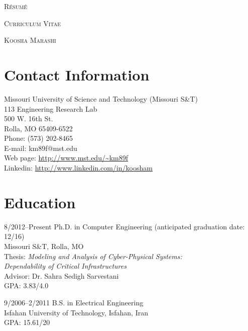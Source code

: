 \documentclass[10pt]{article}
\begin{document}
\thispagestyle{empty}

\begin{center}

\ifResume
    \huge{\textsc{R\'{e}sum\'{e}}}

\else
    \huge{\textsc{Curriculum Vitae}}
\fi

{\Large{\textsc{Koosha Marashi}}}

\end{center}

\section{Contact Information}

\begin{flushleft}

    Missouri University of Science and Technology (Missouri S\&T)\\
    113 Engineering Research Lab \\
    500 W. 16th St. \\
    Rolla, MO 65409-6522 \\
    Phone: (573) 202-8465 \\
    E-mail: km89f@mst.edu \\
    Web page: \url{http://www.mst.edu/\~km89f} \\
    Linkedin: \url{http://www.linkedin.com/in/koosham}

\end{flushleft}

\section{Education}

\begin{CV}

\item[8/2012--Present] Ph.D. in Computer Engineering (anticipated graduation date: 12/16)\\Missouri S\&T, Rolla, MO \\
    Thesis: \emph{Modeling and Analysis of Cyber-Physical Systems:\\Dependability of Critical Infrastructures} \\
    Advisor: Dr. Sahra Sedigh Sarvestani \\
    GPA: 3.83/4.0

\item[9/2006--2/2011] B.S. in Electrical Engineering \\ Isfahan University of Technology, Isfahan, Iran \\
    GPA: 15.61/20

\end{CV}
\end{document}
